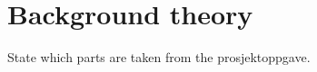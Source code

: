 \chapter{Background theory}\label{chapter:theory}

State which parts are taken from the prosjektoppgave.











